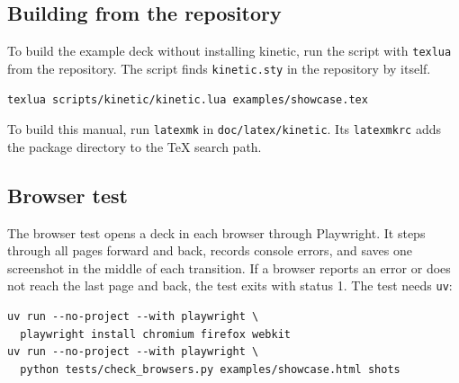 \documentclass[11pt]{article}
\newcommand{\pkg}{\textsf{kinetic}}
\newcommand{\cmd}[1]{\texttt{#1}}
\begin{document}
\subsection{Building from the repository}

To build the example deck without installing \pkg{}, run the script with
\cmd{texlua} from the repository. The script finds \cmd{kinetic.sty} in the
repository by itself.
\begin{lstlisting}
texlua scripts/kinetic/kinetic.lua examples/showcase.tex
\end{lstlisting}
To build this manual, run \cmd{latexmk} in \cmd{doc/latex/kinetic}. Its
\cmd{latexmkrc} adds the package directory to the TeX search path.

\subsection{Browser test}

The browser test opens a deck in each browser through Playwright. It steps through
all pages forward and back, records console errors, and saves one screenshot in
the middle of each transition. If a browser reports an error or does not reach the
last page and back, the test exits with status 1. The test needs \cmd{uv}:
\begin{lstlisting}
uv run --no-project --with playwright \
  playwright install chromium firefox webkit
uv run --no-project --with playwright \
  python tests/check_browsers.py examples/showcase.html shots
\end{lstlisting}
\end{document}
